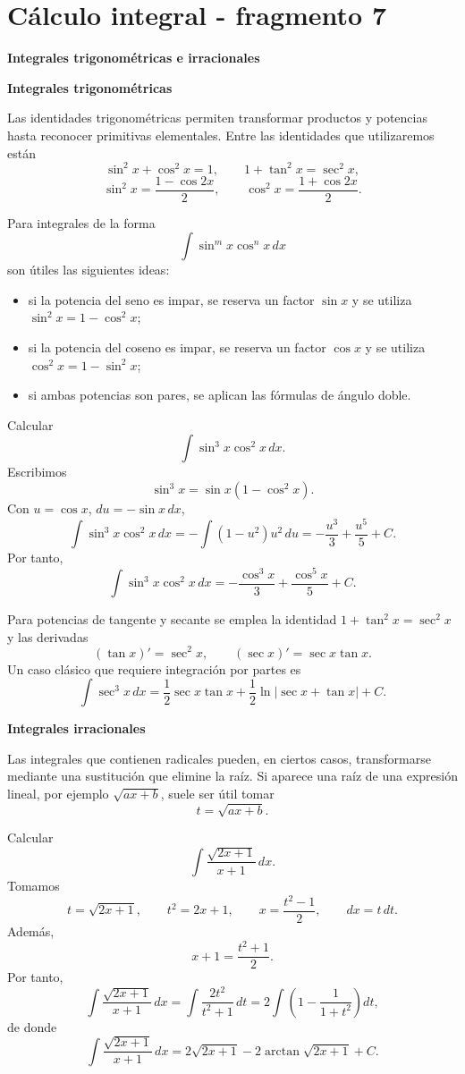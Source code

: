 \section{Cálculo integral - fragmento 7}
\textbf{Integrales trigonométricas e irracionales}

\textbf{Integrales trigonométricas}

Las identidades trigonométricas permiten transformar productos y potencias hasta reconocer primitivas elementales. Entre las identidades que utilizaremos están
\[
\sin^2x+\cos^2x=1,
\qquad
1+\tan^2x=\sec^2x,
\]
\[
\sin^2x=\frac{1-\cos2x}{2},
\qquad
\cos^2x=\frac{1+\cos2x}{2}.
\]

Para integrales de la forma
\[
\int\sin^m x\cos^n x\,dx
\]
son útiles las siguientes ideas:

\begin{itemize}
\item si la potencia del seno es impar, se reserva un factor $\sin x$ y se utiliza $\sin^2x=1-\cos^2x$;
\item si la potencia del coseno es impar, se reserva un factor $\cos x$ y se utiliza $\cos^2x=1-\sin^2x$;
\item si ambas potencias son pares, se aplican las fórmulas de ángulo doble.
\end{itemize}

\begin{example}
Calcular
\[
\int\sin^3x\cos^2x\,dx.
\]
Escribimos
\[
\sin^3x=\sin x(1-\cos^2x).
\]
Con $u=\cos x$, $du=-\sin x\,dx$,
\[
\int\sin^3x\cos^2x\,dx
=-\int(1-u^2)u^2\,du
=-\frac{u^3}{3}+\frac{u^5}{5}+C.
\]
Por tanto,
\[
\boxed{\int\sin^3x\cos^2x\,dx
=-\frac{\cos^3x}{3}+\frac{\cos^5x}{5}+C.}
\]
\end{example}

Para potencias de tangente y secante se emplea la identidad $1+\tan^2x=\sec^2x$ y las derivadas
\[
(\tan x)'=\sec^2x,
\qquad
(\sec x)'=\sec x\tan x.
\]
Un caso clásico que requiere integración por partes es
\[
\int\sec^3x\,dx
=
\frac12\sec x\tan x+\frac12\ln|\sec x+\tan x|+C.
\]

\textbf{Integrales irracionales}

Las integrales que contienen radicales pueden, en ciertos casos, transformarse mediante una sustitución que elimine la raíz. Si aparece una raíz de una expresión lineal, por ejemplo $\sqrt{ax+b}$, suele ser útil tomar
\[
t=\sqrt{ax+b}.
\]

\begin{example}
Calcular
\[
\int\frac{\sqrt{2x+1}}{x+1}\,dx.
\]
Tomamos
\[
t=\sqrt{2x+1},
\qquad t^2=2x+1,
\qquad x=\frac{t^2-1}{2},
\qquad dx=t\,dt.
\]
Además,
\[
x+1=\frac{t^2+1}{2}.
\]
Por tanto,
\[
\int\frac{\sqrt{2x+1}}{x+1}\,dx
=
\int\frac{2t^2}{t^2+1}\,dt
=
2\int\left(1-\frac1{1+t^2}\right)dt,
\]
de donde
\[
\boxed{\int\frac{\sqrt{2x+1}}{x+1}\,dx
=2\sqrt{2x+1}-2\arctan\!\sqrt{2x+1}+C.}
\]
\end{example}


